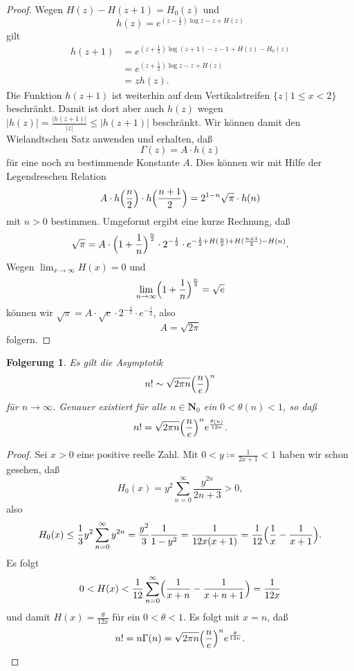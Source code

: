 \documentclass[a4paper,twoside,openright]{report}
\newtheorem{cor}[thm]{Folgerung}
\theoremstyle{definition}
\theoremstyle{remark}
\begin{document}
\begin{proof}
  Wegen $H(z) - H(z + 1) = H_0(z)$ und
  \[
    h(z) = e^{(z - \frac 1 2) \log z - z + H(z)}
  \]
  gilt
  \[
    \begin{split}    
    h(z + 1) 
    & = e^{(z + \frac 1 2) \log (z + 1) - z - 1 + H(z) - H_0(z)}
    \\
    & = e^{(z + \frac 1 2) \log z - z + H(z)}
    \\
    & = z h(z).
    \end{split}
  \]
  Die Funktion $h(z + 1)$ ist weiterhin auf dem Vertikalstreifen
  $\{z \mid 1 \leq x < 2\}$ beschränkt. Damit ist dort aber auch
  $h(z)$ wegen $|h(z)| = \frac{|h(z + 1)|}{|z|} \leq |h(z + 1)|$
  beschränkt. Wir können damit den Wielandtschen Satz anwenden und
  erhalten, daß
  \[
    \Gamma(z) = A \cdot h(z)
  \]
  für eine noch zu bestimmende Konstante $A$. Dies können wir mit Hilfe
  der Legendreschen Relation
  \[
    A \cdot h\Bigl(\frac n 2\Bigr) \cdot h\Bigl(\frac{n + 1} 2\Bigr) = 2^{1 - n} \sqrt{\pi} \cdot h(n)  
  \]
  mit $n > 0$ bestimmen. Umgeformt ergibt eine kurze Rechnung, daß
  \[
    \sqrt\pi = A \cdot \Bigl(1 + \frac 1 n\Bigr)^{\frac n 2}
    \cdot 2^{-\frac 1 2} \cdot
    e^{-\frac 1 2 + H(\frac n 2) + H(\frac {n + 1} 2) - H(n)}.
  \]
  Wegen $\lim_{x \to \infty} H(x) = 0$ und
  \[
    \lim_{n \to \infty}\Bigl(1 + \frac 1 n\Bigr)^{\frac n 2} = \sqrt{e}
  \]
  können wir $\sqrt\pi = A \cdot \sqrt{e} \cdot 2^{-\frac 1 2} \cdot
  e^{-\frac 1 2}$, also
  \[
    A = \sqrt{2 \pi}
  \]
  folgern.
\end{proof}

\begin{cor}
  Es gilt die Asymptotik
  \[
    n! \sim \sqrt{2 \pi n} \Bigl(\frac n e\Bigr)^n 
  \]
  für $n \to \infty$. Genauer existiert
  für alle $n \in \mathbf N_0$ ein $0 < \theta(n) < 1$, so daß
  \[
    n! = \sqrt{2 \pi n} \Bigl(\frac n e\Bigr)^n e^{\frac {\theta(n)} {12 n}}.
  \]
\end{cor}

\begin{proof}
  Sei $x > 0$ eine positive reelle Zahl. Mit
  $0 < y \coloneqq \frac 1 {2 x + 1} < 1$ haben
  wir schon gesehen, daß
  \[
    H_0(x) = y^2 \sum_{n = 0}^\infty \frac {y^{2n}}{2n + 3} > 0,
  \]
  also
  \[
    H_0(x)
    \leq \frac 1 3 y^2 \sum_{n = 0}^\infty y^{2n}
    = \frac {y^2} 3 \frac 1 {1 - y^2}
    = \frac{1} {12 x (x + 1)}
    = \frac 1 {12} \Bigl(\frac 1 x - \frac 1 {x + 1}\Bigr).
  \]
  Es folgt
  \[
    0 < H(x) < \frac 1 {12} \sum_{n = 0}^\infty \Bigl(
      \frac 1 {x + n} - \frac 1 {x + n + 1}\Bigr) = \frac 1 {12 x}
  \]
  und damit $H(x) = \frac{\theta}{12 x}$ für ein $0 < \theta < 1$.
  Es folgt mit $x = n$, daß
  \[
    n! = n \Gamma(n) = \sqrt{2 \pi n}
    \Bigl(\frac n e\Bigr)^n e^{\frac {\theta}{12n}}.
    \qedhere
  \]
\end{proof}
\end{document}
